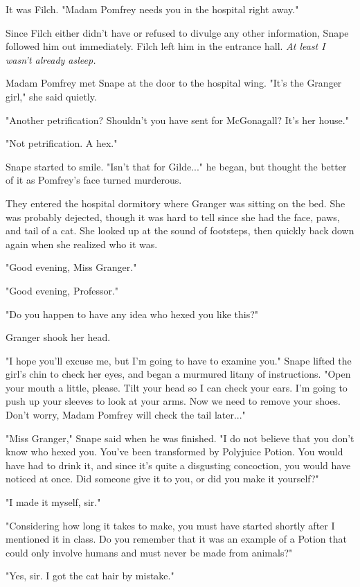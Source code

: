 \documentclass[a4paper,11pt]{article}
\begin{document}
It was Filch. "Madam Pomfrey needs you in the hospital right away."

Since Filch either didn't have or refused to divulge any other information, Snape followed him out immediately. Filch left him in the entrance hall. \emph{At least I wasn't already asleep.}

Madam Pomfrey met Snape at the door to the hospital wing. "It's the Granger girl," she said quietly.

"Another petrification? Shouldn't you have sent for McGonagall? It's her house."

"Not petrification. A hex."

Snape started to smile. "Isn't that for Gilde..." he began, but thought the better of it as Pomfrey's face turned murderous.

They entered the hospital dormitory where Granger was sitting on the bed. She was probably dejected, though it was hard to tell since she had the face, paws, and tail of a cat. She looked up at the sound of footsteps, then quickly back down again when she realized who it was.

"Good evening, Miss Granger."

"Good evening, Professor."

"Do you happen to have any idea who hexed you like this?"

Granger shook her head.

"I hope you'll excuse me, but I'm going to have to examine you." Snape lifted the girl's chin to check her eyes, and began a murmured litany of instructions. "Open your mouth a little, please. Tilt your head so I can check your ears. I'm going to push up your sleeves to look at your arms. Now we need to remove your shoes. Don't worry, Madam Pomfrey will check the tail later..."

"Miss Granger," Snape said when he was finished. "I do not believe that you don't know who hexed you. You've been transformed by Polyjuice Potion. You would have had to drink it, and since it's quite a disgusting concoction, you would have noticed at once. Did someone give it to you, or did you make it yourself?"

"I made it myself, sir."

"Considering how long it takes to make, you must have started shortly after I mentioned it in class. Do you remember that it was an example of a Potion that could only involve humans and must never be made from animals?"

"Yes, sir. I got the cat hair by mistake."
\end{document}
